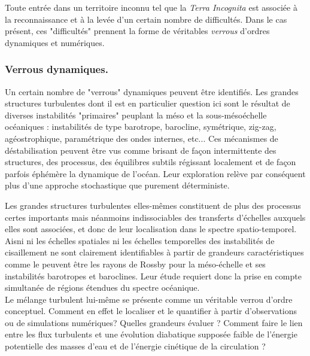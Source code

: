 
Toute entrée dans un territoire inconnu tel que la \textit{Terra Incognita} est associée à la reconnaissance et à la levée d'un certain nombre de difficultés. Dans le cas présent, ces "difficultés" prennent la forme de véritables \textit{verrous} d'ordres dynamiques et numériques.

\subsubsection{Verrous dynamiques.}
Un certain nombre de "verrous" dynamiques peuvent être identifiés. Les grandes structures turbulentes dont il est en particulier question ici sont le résultat de diverses instabilités "primaires" peuplant la méso et la sous-mésoéchelle océaniques : instabilités de type barotrope, barocline, symétrique, zig-zag, agéostrophique, paramétrique des ondes internes, etc... Ces mécanismes de déstabilisation peuvent être vus comme brisant de façon intermittente des structures, des processus, des équilibres subtils régissant localement et de façon parfois éphémère la dynamique de l'océan. Leur exploration relève par conséquent plus d'une approche stochastique que purement déterministe.

Les grandes structures turbulentes elles-mêmes constituent de plus des processus certes importants mais néanmoins indissociables des transferts d'échelles auxquels elles sont associées, et donc de leur localisation dans le spectre spatio-temporel. %
Aisni ni les échelles spatiales ni les échelles temporelles des instabilités de cisaillement ne sont clairement identifiables à partir de grandeurs caractéristiques comme le peuvent être les rayons de Rossby pour la méso-échelle et ses instabilités barotropes et baroclines. Leur étude requiert donc la prise en compte simultanée de régions étendues du spectre océanique.\\

Le mélange turbulent lui-même se présente comme un véritable verrou d'ordre conceptuel. Comment en effet le localiser et le quantifier à partir d'observations ou de simulations numériques? Quelles grandeurs évaluer ? 
Comment faire le lien entre les flux turbulents et une évolution diabatique supposée faible de l'énergie potentielle des masses d'eau et de l'énergie cinétique de la circulation ? 

